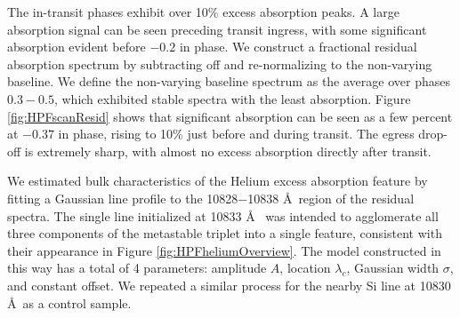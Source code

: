 \documentclass[twocolumn]{aastex631}
\begin{document}
The in-transit phases exhibit over 10\% excess absorption peaks.  A large absorption signal can be seen preceding transit ingress, with some significant absorption evident before $-0.2$ in phase.  We construct a fractional residual absorption spectrum by subtracting off and re-normalizing to the non-varying baseline.  We define the non-varying baseline spectrum as the average over phases $0.3-0.5$, which exhibited stable spectra with the least absorption.  Figure \ref{fig:HPFscanResid} shows that significant absorption can be seen as a few percent at $-0.37$ in phase, rising to 10\% just before and during transit.  The egress drop-off is extremely sharp, with almost no excess absorption directly after transit.


We estimated bulk characteristics of the Helium excess absorption feature by fitting a Gaussian line profile to the 10828$-$10838 \AA~region of the residual spectra.  The single line initialized at 10833 \AA~ was intended to agglomerate all three components of the metastable triplet into a single feature, consistent with their appearance in Figure \ref{fig:HPFheliumOverview}.  The model constructed in this way has a total of 4 parameters: amplitude $A$, location $\lambda_c$, Gaussian width $\sigma$, and constant offset.  We repeated a similar process for the nearby Si line at 10830 \AA~as a control sample.
\end{document}
